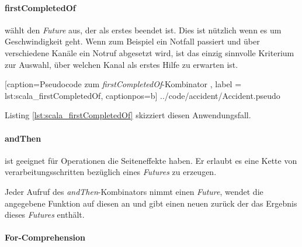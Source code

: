 \paragraph{firstCompletedOf} wählt den \emph{Future} aus, der als
erstes beendet ist. Dies ist nützlich wenn es um Geschwindigkeit
geht. Wenn zum Beispiel ein Notfall passiert und über verschiedene
Kanäle ein Notruf abgesetzt wird, ist das einzig sinnvolle Kriterium
zur Auswahl, über welchen Kanal als erstes Hilfe zu erwarten ist.


    [caption={Pseudocode zum \emph{firstCompletedOf}-Kombinator },
       label = lst:scala_firstCompletedOf,
       captionpos=b]
 {../code/accident/Accident.pseudo}
 
Listing \ref{lst:scala_firstCompletedOf} skizziert diesen
Anwendungsfall.

\paragraph{andThen} ist geeignet für Operationen die Seiteneffekte
haben. Er erlaubt es eine Kette von verarbeitungsschritten bezüglich
eines \emph{Futures} zu erzeugen.

Jeder Aufruf des \emph{andThen}-Kombinators nimmt einen \emph{Future},
wendet die angegebene Funktion auf diesen an und gibt einen neuen
zurück der das Ergebnis dieses \emph{Futures} enthält.

\paragraph{For-Comprehension}
